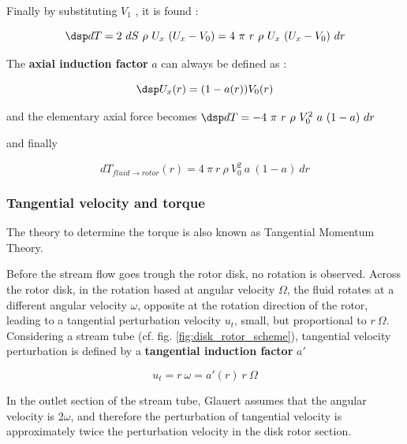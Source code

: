 Finally by substituting $V_1$ , it is found :

\begin{equation} \dsp 
dT =  2~dS~\rho~U_x~(U_x-V_0) = 4~\pi~r~\rho~U_x~(U_x-V_0)~dr
\label{eq:3}
\end{equation}


The \textbf{axial induction factor} $a$ can always be defined    as :

\begin{equation} \dsp 
U_x(r) = (1-a(r)) V_0(r)
  \label{eq:def_ap}
\end{equation}

and the elementary axial force becomes
$\dsp  dT = - 4~\pi~r~\rho~V_0^2~a~(1-a)~dr$

and finally

\begin{equation}
dT_{fluid\to rotor}(r) = 4~\pi~r~\rho~V_0^2~a~(1-a)~dr
\label{eq:Tf-r}
\end{equation}
 



\subsubsection{\sc Tangential velocity and torque}
\label{secsec:ut}

The theory to determine the torque is also known as Tangential Momentum Theory.

Before the stream flow goes trough the rotor disk, no rotation is observed.
Across the rotor disk, in the rotation based at angular  velocity $\Omega$,
the fluid rotates at a different angular velocity $\omega$, opposite at the rotation direction of the rotor,
leading to a tangential perturbation velocity $u_t$, small, but proportional to $r~\Omega$.
Considering a  stream tube (cf. fig. \ref{fig:disk_rotor_scheme}),
tangential velocity perturbation is defined by   
a \textbf{tangential induction factor} $a'$

\begin{equation}
u_t = r ~\omega = a'(r)~r~\Omega 
\label{eq:def_aprime}
\end{equation}

In the outlet section of the stream tube, Glauert assumes that the angular velocity is $2\omega$,
and therefore the perturbation of tangential velocity is approximately twice 
the perturbation velocity in the disk rotor section. 

